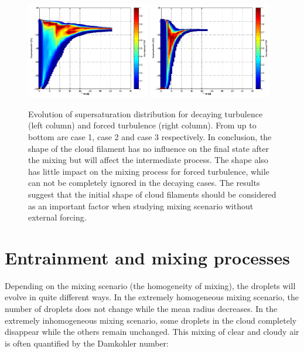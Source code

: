 \documentclass[draft,jgrga]{AGUTeX}
\begin{document}
\begin{article}
\begin{figure}[H]
\includegraphics[width=0.48\textwidth]{Figures/pdf_supersat_d3}
\includegraphics[width=0.48\textwidth]{Figures/pdf_supersat_f3}
\caption{Evolution of supersaturation distribution for decaying turbulence (left column) and forced turbulence (right column). From up to bottom are case 1, case 2 and case 3 respectively. In conclusion, the shape of the cloud filament has no influence on the final state after the mixing but will affect the intermediate process. The shape also has little impact on the mixing process for forced turbulence, while can not be completely ignored in the decaying cases. The results suggest that the initial shape of cloud filaments should be considered as an important factor when studying mixing scenario without external forcing.}\label{fig:supersat_distri}
\end{figure}

\section{Entrainment and mixing processes}\label{mixing_processes}
Depending on the mixing scenario (the homogeneity of mixing), the
droplets will evolve in quite different ways. In the extremely homogeneous mixing scenario, the number of droplets does not change while the mean radius decreases. In the extremely inhomogeneous mixing scenario, some droplets in the cloud completely disappear while the others remain unchanged. This mixing of clear and cloudy air is often quantified by the Damkohler number:


\end{article}
\end{document}

